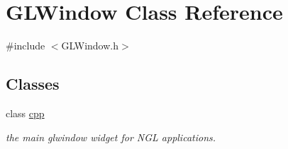 \hypertarget{classGLWindow}{
\section{GLWindow Class Reference}
\label{classGLWindow}
}


{\ttfamily \#include $<$GLWindow.h$>$}\subsection*{Classes}
\begin{DoxyCompactItemize}
\item 
class \hyperlink{classGLWindow_1_1cpp}{cpp}
\begin{DoxyCompactList}\small\item\em the main glwindow widget for NGL applications. \item\end{DoxyCompactList}\end{DoxyCompactItemize}
